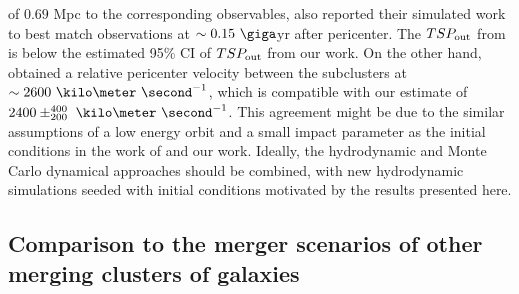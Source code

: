 \documentclass[letterpaper,useAMS,usenatbib]{mn2e}
\begin{document}
of $0.69$ Mpc to the corresponding observables, \cite{Donnert13} also reported their simulated work 
to best match  observations at $\sim 0.15~\giga$yr after pericenter. 
The $TSP_{\rm out}$ from \cite{Donnert13} is below the estimated 95\% CI of
$TSP_{\rm out}$ from our work.
On the other hand, \cite{Donnert13} obtained a
relative pericenter velocity between the subclusters at $\sim
2600~\kilo\meter~\second^{-1}$, which is compatible with our estimate of
$2400\pm^{400}_{200}~\kilo\meter~\second^{-1}$.  
This agreement might be due to the similar assumptions of a low
energy orbit and a small impact parameter as the initial conditions in the
work of \cite{Donnert13} and our work. 
Ideally, the hydrodynamic and Monte Carlo dynamical approaches should be combined, with new hydrodynamic simulations seeded with initial conditions motivated by the results presented here.


\subsection{Comparison to the merger scenarios of other merging clusters of galaxies}
\end{document}
